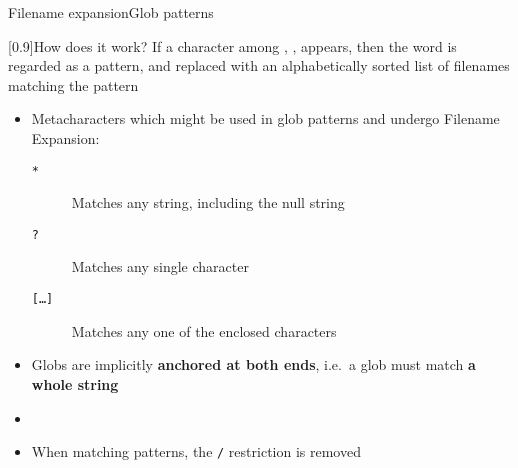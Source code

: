 \begin{frame}{Filename expansion}{Glob patterns}
    \vspace{-3mm}
    \begin{varblock}{}[0.9\textwidth]{How does it work?}
        If a character among \PB{\texttt{*}}, , \PB{\texttt{[}} appears, then the word is regarded as a pattern, and replaced with an alphabetically sorted list of filenames matching the pattern
    \end{varblock}
    \begin{itemize}
        \item Metacharacters which might be used in glob patterns and undergo Filename Expansion:
              \begin{description}
                  \item[\texttt{*}]
                      Matches any string, including the null string
                  \item[\texttt{?}]
                      Matches any single character
                  \item[\texttt{[\ldots]}]
                      Matches any one of the enclosed characters
              \end{description}
        \item Globs are implicitly \textbf{anchored at both ends}, i.e.\ \alert{a glob must match \textbf{a whole string}}
        \item {}
        \item When matching patterns, the \texttt{/} restriction is removed
    \end{itemize}
    \PrepareURLsymbol[PB]
\end{frame}
